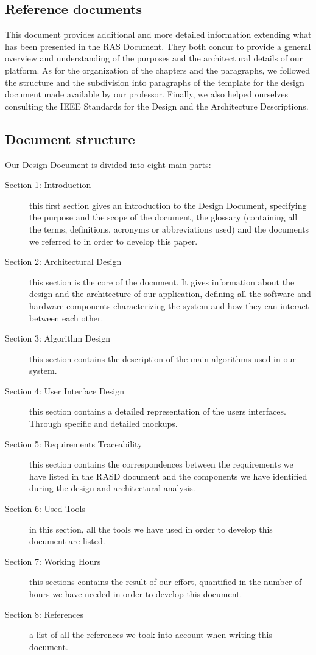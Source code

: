  
\subsection{Reference documents }
This document provides additional and more detailed information extending what has been
presented in the RAS Document. They both concur to provide a general overview and understanding
of the purposes and the architectural details of our platform.
As for the organization of the chapters and the paragraphs, we followed the structure and the 
subdivision into paragraphs of the template for the design document made available by our professor. 
Finally, we also helped ourselves consulting the IEEE Standards for the Design and the Architecture 
Descriptions. 
 
 
\subsection{Document structure}
Our Design Document is divided into eight main parts: 
\begin{description}
    \item[Section 1: Introduction]
        this first section gives an introduction to the Design Document, specifying the purpose and the 
        scope of the document, the glossary (containing all the terms, definitions, acronyms or 
        abbreviations used) and the documents we referred to in order to develop this paper. 
    \item[Section 2: Architectural Design]
        this section is the core of the document. It gives information about the design and the 
        architecture of our application, defining all the software and hardware components 
        characterizing the system and how they can interact between each other.
    \item[Section 3: Algorithm Design]
        this section contains the description of the main algorithms used in our system. 
    \item[Section 4: User Interface Design]
        this section contains a detailed representation of the users interfaces. Through specific and 
        detailed mockups. 
    \item[Section 5: Requirements Traceability] 
        this section contains the correspondences between the requirements we have listed in the 
        RASD document and the components we have identified during the design and architectural 
        analysis. 
    \item[Section 6: Used Tools] 
        in this section, all the tools we have used in order to develop this document are listed. 
    \item[Section 7: Working Hours] 
        this sections contains the result of our effort, quantified in the number of hours we have 
        needed in order to develop this document. 
    \item[Section 8: References] 
        a list of all the references we took into account when writing this document.
\end{description}
